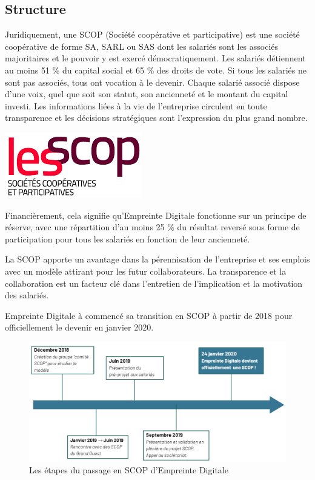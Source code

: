 \documentclass[12pt, a4paper, twoside]{article}
\begin{document}
\subsection{Structure}

\noindent%
\begin{minipage}{.7\textwidth}%
Juridiquement, une \gls{SCOP} (Société coopérative et participative) est une société coopérative de forme \gls{SA}, \gls{SARL} ou \gls{SAS} dont les salariés sont les associés majoritaires et le pouvoir y est exercé démocratiquement.
Les salariés détiennent au moins 51 \% du capital social et 65 \% des droits de vote. 
Si tous les salariés ne sont pas associés, tous ont vocation à le devenir. 
Chaque salarié associé dispose d’une voix, quel que soit son statut, son ancienneté et le montant du capital investi.
Les informations liées à la vie de l’entreprise circulent en toute transparence et les décisions stratégiques sont l’expression du plus grand nombre. \cite{Scop} \\
\end{minipage}%
\hfill
\begin{minipage}{.3\textwidth}%
\begin{center}
    \includegraphics[scale=0.7]{src/logo_scop.png}
\end{center}
\end{minipage}%

Financièrement, cela signifie qu'Empreinte Digitale fonctionne sur un principe de réserve, avec une répartition d'au moins 25 \% du résultat reversé sous forme de participation pour tous les salariés en fonction de leur ancienneté.

La \gls{SCOP} apporte un avantage dans la pérennisation de l'entreprise et ses emplois avec un modèle attirant pour les futur collaborateurs. 
La transparence et la collaboration est un facteur clé dans l'entretien de l'implication et la motivation des salariés.

Empreinte Digitale à commencé sa transition en \gls{SCOP} à partir de 2018 pour officiellement le devenir en janvier 2020.
\begin{figure}[!ht]
    \centering
    \includegraphics[width=\textwidth]{src/graph_scop.png}
    \caption{Les étapes du passage en \gls{SCOP} d'Empreinte Digitale}
    \label{fig:transition_scop}
\end{figure}
\end{document}
